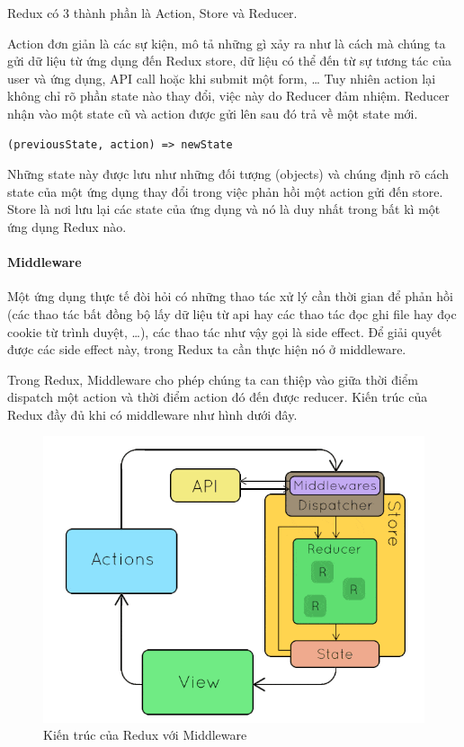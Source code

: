 Redux có 3 thành phần là Action, Store và Reducer.

Action đơn giản là các sự kiện, mô tả những gì xảy ra như 
là cách mà chúng ta gửi dữ liệu từ ứng dụng đến Redux store, 
dữ liệu có thể đến từ sự tương tác của user và ứng dụng, 
API call hoặc khi submit một form, … Tuy nhiên action lại không 
chỉ rõ phần state nào thay đổi, việc này do Reducer đảm nhiệm. 
Reducer nhận vào một state cũ và action được gửi lên 
sau đó trả về một state mới. 

\begin{lstlisting}
(previousState, action) => newState
\end{lstlisting}

Những state này được lưu như những đối tượng (objects) và
chúng định rõ cách state của một ứng dụng thay đổi trong việc
phản hồi một action gửi đến store. Store là nơi lưu lại các
state của ứng dụng và nó là duy nhất
trong bất kì một ứng dụng Redux nào.

\paragraph{Middleware}
Một ứng dụng thực tế đòi hỏi có những thao tác xử lý cần thời
gian để phản hồi (các thao tác bất đồng bộ lấy dữ liệu từ
api hay các thao tác đọc ghi file hay đọc cookie từ trình duyệt, …),
các thao tác như vậy gọi là side effect. Để giải quyết được
các side effect này, trong Redux ta cần thực hiện nó ở middleware.

Trong Redux, Middleware cho phép chúng ta can thiệp vào giữa
thời điểm dispatch một action và thời điểm action đó đến được
reducer. Kiến trúc của Redux đầy đủ khi có middleware như hình dưới đây.

\begin{figure}[H]
\centering
\includegraphics[width=12cm]{images/redux-architecture.png}
\caption{Kiến trúc của Redux với Middleware}
\end{figure}

